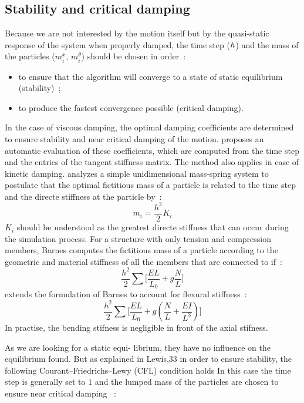 \subsection{Stability and critical damping}
Because we are not interested by the motion itself but by the quasi-static response of the system when properly damped, the time step ($h{}$) and the mass of the particles ($m_i^x$, $m_i^{\theta}$) should be chosen in order~:
\begin{itemize}
\item to ensure that the algorithm will converge to a state of static equilibrium (stability)~;
\item to produce the fastest convergence possible (critical damping).
\end{itemize}
In the case of viscous damping, the optimal damping coefficients are determined to ensure stability and near critical damping of the motion.  proposes an automatic evaluation of these coefficients, which are computed from the time step and the entries of the tangent stiffness matrix. The method also applies in case of kinetic damping.  analyzes a simple unidimensional mass-spring system to postulate that the optimal fictitious mass of a particle is related to the time step and the directe stiffness at the particle by~:
\begin{equation}
	m_i = \frac{h^2}{2} K_i
\end{equation}
$K_i$ should be understood as the greatest directe stiffness that can occur during the simulation process.
For a structure with only tension and compression members, Barnes computes the fictitious mass of a particle according to the geometric and material stiffness of all the members that are connected to if~:
\begin{equation}
	\frac{h^2}{2} \sum \bigl[\frac{EL}{L_0} + g \frac{N}{L} \bigr]
\end{equation}
 extends the formulation of Barnes to account for flexural stiffness~:
\begin{equation}
	\frac{h^2}{2} \sum \bigl[\frac{EL}{L_0} + g \left(\frac{N}{L} + \frac{EI}{L^3} \right) \bigr]
\end{equation}
In practise, the bending stifness is negligible in front of the axial stifness.

As we are looking for a static equi- librium, they have no influence on the equilibrium found. But as explained in Lewis,33 in order to ensure stability, the following Courant–Friedrichs–Lewy (CFL) condition holds
In this case the time step is generally set to $1$ and the lumped mass of the particles are chosen to ensure near critical damping \cite{Barnes1977}~:




